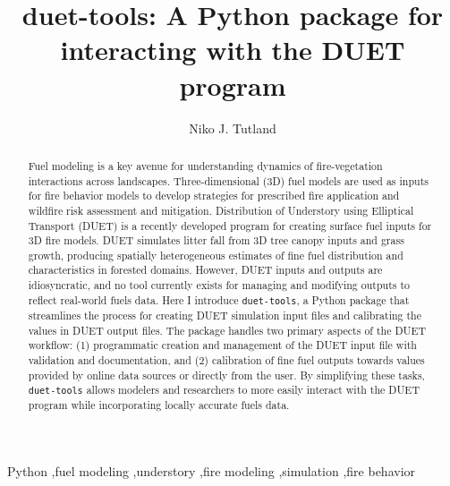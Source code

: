 \documentclass[preprint,12pt,a4paper]{elsarticle}
\begin{document}
\begin{frontmatter}

\title{duet-tools: A Python package for interacting with the DUET program}

\author[label1]{Niko J. Tutland}
\address[label1]{New Mexico Consortium, Center for Applied Fire and Ecosystem Science, Los Alamos, NM, USA}

\begin{abstract}
Fuel modeling is a key avenue for understanding dynamics of fire-vegetation interactions across landscapes.
Three-dimensional (3D) fuel models are used as inputs for fire behavior models to develop strategies for prescribed fire application and wildfire risk assessment and mitigation.
Distribution of Understory using Elliptical Transport (DUET) is a recently developed program for creating surface fuel inputs for 3D fire models.
DUET simulates litter fall from 3D tree canopy inputs and grass growth, producing spatially heterogeneous estimates of fine fuel distribution and characteristics in forested domains.
However, DUET inputs and outputs are idiosyncratic, and no tool currently exists for managing and modifying outputs to reflect real-world fuels data.
Here I introduce \texttt{duet-tools}, a Python package that streamlines the process for creating DUET simulation input files and calibrating the values in DUET output files.
The package handles two primary aspects of the DUET workflow: (1) programmatic creation and management of the DUET input file with validation and documentation, and (2) calibration of fine fuel outputs towards values provided by online data sources or directly from the user.
By simplifying these tasks, \texttt{duet-tools} allows modelers and researchers to more easily interact with the DUET program while incorporating locally accurate fuels data.
\end{abstract}

\begin{keyword}
Python \sep fuel modeling \sep understory \sep fire modeling \sep simulation \sep fire behavior
\end{keyword}

\end{frontmatter}
\end{document}
